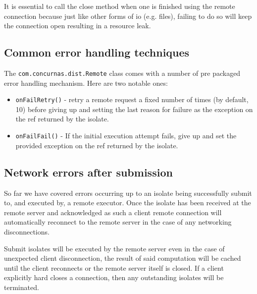 \documentclass[conc-doc]{subfiles}
\begin{document}
It is essential to call the close method when one is finished using the remote connection because just like other forms of io (e.g. files), failing to do so will keep the connection open resulting in a resource leak.

\subsection{Common error handling techniques}
The \lstinline{com.concurnas.dist.Remote} class comes with a number of pre packaged error handling mechanism. Here are two notable ones:

\begin{itemize}
	\item \lstinline{onFailRetry()} - retry a remote request a fixed number of times (by default, 10) before giving up and setting the last reason for failure as the exception on the ref returned by the isolate.
	\item \lstinline{onFailFail()} - If the initial execution attempt fails, give up and set the provided exception on the ref returned by the isolate.
\end{itemize}

\subsection{Network errors after submission}
So far we have covered errors occurring up to an isolate being successfully submit to, and executed by, a remote executor. Once the isolate has been received at the remote server and acknowledged as such a client remote connection will automatically reconnect to the remote server in the case of any networking disconnections.

Submit isolates will be executed by the remote server even in the case of unexpected client disconnection, the result of said computation will be cached until the client reconnects or the remote server itself is closed. If a client explicitly hard closes a connection, then any outstanding isolates will be terminated.



\end{document}
